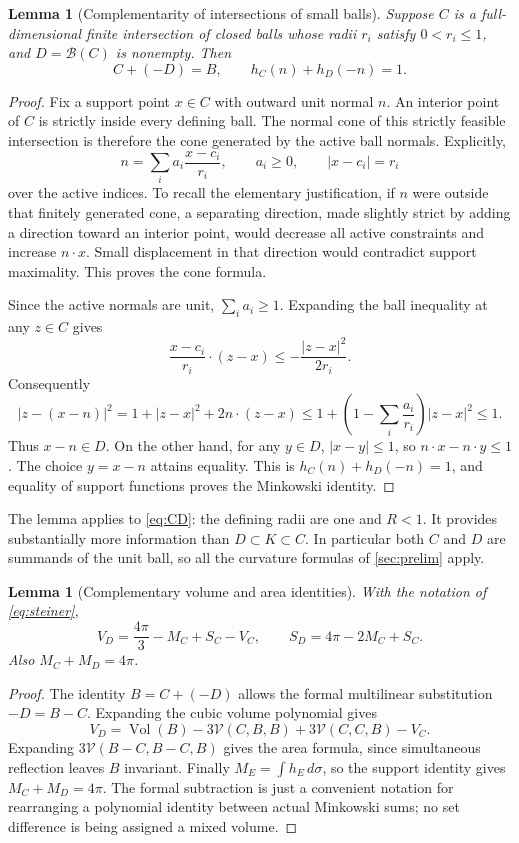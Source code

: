 \documentclass[11pt]{article}
\numberwithin{equation}{section}
\newtheorem{lemma}[theorem]{Lemma}
\theoremstyle{definition}\newtheorem{definition}[theorem]{Definition}
\theoremstyle{remark}\newtheorem{remark}[theorem]{Remark}
\newcommand{\B}{\mathcal B}
\newcommand{\Vol}{\operatorname{Vol}}
\newcommand{\mix}{\mathcal V}
\begin{document}
\begin{lemma}[Complementarity of intersections of small balls]\label{lem:complement}
Suppose $C$ is a full-dimensional finite intersection of closed balls whose
radii $r_i$ satisfy $0<r_i\le1$, and $D=\B(C)$ is nonempty. Then
\begin{equation}\label{eq:complement}
 C+(-D)=B,\qquad h_C(n)+h_D(-n)=1.
\end{equation}
\end{lemma}
\begin{proof}
Fix a support point $x\in C$ with outward unit normal $n$. An interior point
of $C$ is strictly inside every defining ball. The normal cone of this
strictly feasible intersection is therefore the cone generated by the active
ball normals. Explicitly,
\[
 n=\sum_i a_i\frac{x-c_i}{r_i},\qquad a_i\ge0,\qquad |x-c_i|=r_i
\]
over the active indices. To recall the elementary justification, if $n$ were
outside that finitely generated cone, a separating direction, made slightly
strict by adding a direction toward an interior point, would decrease all
active constraints and increase $n\cdot x$. Small displacement in that
direction would contradict support maximality. This proves the cone formula.

Since the active normals are unit, $\sum_i a_i\ge1$. Expanding the ball
inequality at any $z\in C$ gives
\[
 \frac{x-c_i}{r_i}\cdot(z-x)\le-\frac{|z-x|^2}{2r_i}.
\]
Consequently
\[
 |z-(x-n)|^2
 =1+|z-x|^2+2n\cdot(z-x)
 \le1+\left(1-\sum_i\frac{a_i}{r_i}\right)|z-x|^2\le1.
\]
Thus $x-n\in D$. On the other hand, for any $y\in D$, $|x-y|\le1$, so
$n\cdot x-n\cdot y\le1$. The choice $y=x-n$ attains equality. This is
$h_C(n)+h_D(-n)=1$, and equality of support functions proves the Minkowski
identity.
\end{proof}

The lemma applies to \cref{eq:CD}: the defining radii are one and $R<1$.
It provides substantially more information than $D\subset K\subset C$.
In particular both $C$ and $D$ are summands of the unit ball, so all the
curvature formulas of \cref{sec:prelim} apply.

\begin{lemma}[Complementary volume and area identities]\label{lem:dualvol}
With the notation of \cref{eq:steiner},
\begin{equation}\label{eq:dualvol}
 \boxed{V_D=\frac{4\pi}{3}-M_C+S_C-V_C,\qquad
 S_D=4\pi-2M_C+S_C.}
\end{equation}
Also $M_C+M_D=4\pi$.
\end{lemma}
\begin{proof}
The identity $B=C+(-D)$ allows the formal multilinear substitution
$-D=B-C$. Expanding the cubic volume polynomial gives
\[
 V_D=\Vol(B)-3\mix(C,B,B)+3\mix(C,C,B)-V_C.
\]
Expanding $3\mix(B-C,B-C,B)$ gives the area formula, since simultaneous
reflection leaves $B$ invariant. Finally $M_E=\int h_E\,d\sigma$, so the
support identity gives $M_C+M_D=4\pi$. The formal subtraction is just a
convenient notation for rearranging a polynomial identity between actual
Minkowski sums; no set difference is being assigned a mixed volume.
\end{proof}
\end{document}
